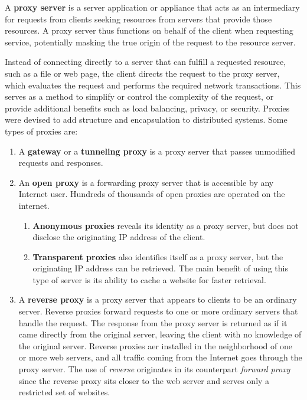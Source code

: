\documentclass{article}
\newcounter{definition}[section]
\begin{document}
  \begin{definition}
    \label{def:proxy-server}
  A \textbf{proxy server} is a server application or appliance that acts as an intermediary for requests from clients seeking resources from servers that provide those resources. A proxy server thus functions on behalf of the client when requesting service, potentially masking the true origin of the request to the resource server. 

  Instead of connecting directly to a server that can fulfill a requested resource, such as a file or web page, the client directs the request to the proxy server, which evaluates the request and performs the required network transactions. This serves as a method to simplify or control the complexity of the request, or provide additional benefits such as load balancing, privacy, or security. Proxies were devised to add structure and encapsulation to distributed systems. Some types of proxies are: 
  \begin{enumerate}
      \item A \textbf{gateway} or a \textbf{tunneling proxy} is a proxy server that passes unmodified requests and responses. 
      \item An \textbf{open proxy} is a forwarding proxy server that is accessible by any Internet user. Hundreds of thousands of open proxies are operated on the internet. 
      \begin{enumerate}
          \item \textbf{Anonymous proxies} reveals its identity as a proxy server, but does not disclose the originating IP address of the client. 
          \item \textbf{Transparent proxies} also identifies itself as a proxy server, but the originating IP address can be retrieved. The main benefit of using this type of server is its ability to cache a website for faster retrieval. 
      \end{enumerate}
      \item A \textbf{reverse proxy} is a proxy server that appears to clients to be an ordinary server. Reverse proxies forward requests to one or more ordinary servers that handle the request. The response from the proxy server is returned as if it came directly from the original server, leaving the client with no knowledge of the original server. Reverse proxies aer installed in the neighborhood of one or more web servers, and all traffic coming from the Internet goes through the proxy server. The use of \textit{reverse} originates in its counterpart \textit{forward proxy} since the reverse proxy sits closer to the web server and serves only a restricted set of websites. 

\end{enumerate}
\end{definition}
\end{document}
